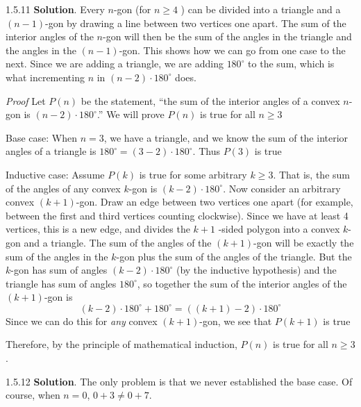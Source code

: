 \documentclass[11pt,]{book}
\makeatletter
\theoremstyle{ptxplainnotitle}
\theoremstyle{ptxplaintitle}
\renewcommand*{\proofname}{Proof}
\renewenvironment{proof}[1][\proofname]{\par
  \pushQED{\qed}%
  \normalfont \topsep6\p@\@plus6\p@\relax
  \trivlist
  \item\relax
    {\itshape
    #1\@addpunct{.}}\hspace\labelsep\ignorespaces
}{%
  \popQED\endtrivlist\@endpefalse
}
\theoremstyle{ptxdefinitionnotitle}
\theoremstyle{ptxdefinitiontitle}
\theoremstyle{ptxdefinitionnotitle}
\theoremstyle{ptxdefinitiontitle}
\theoremstyle{ptxdefinitionnotitle}
\theoremstyle{ptxdefinitiontitle}
\theoremstyle{ptxdefinitiontitlenonumber}
\theoremstyle{ptxdefinitiontitlenonumber}
\numberwithin{equation}{chapter}
\makeatother
\begin{document}
\begin{divisionexercise}{1.5.11}
\textbf{Solution}.\quad%
\hypertarget{p-608}{}%
Every \(n\)-gon (for \(n \ge 4\) ) can be divided into a triangle and a \((n-1)\)-gon by drawing a line between two vertices one apart.  The sum of the interior angles of the \(n\)-gon will then be the sum of the angles in the triangle and the angles in the \((n-1)\)-gon.  This shows how we can go from one case to the next.  Since we are adding a triangle, we are adding \(180^\circ\) to the sum, which is what incrementing \(n\) in \((n-2)\cdot 180^\circ\) does.%
\begin{proof}\hypertarget{proof-10}{}
\hypertarget{p-609}{}%
Let \(P(n)\) be the statement, ``the sum of the interior angles of a convex \(n\)-gon is \((n-2)\cdot 180^\circ\).''  We will prove \(P(n)\) is true for all \(n \ge 3\)%
\par
\hypertarget{p-610}{}%
Base case: When \(n=3\), we have a triangle, and we know the sum of the interior angles of a triangle is \(180^\circ = (3-2)\cdot 180^\circ\).  Thus \(P(3)\) is true%
\par
\hypertarget{p-611}{}%
Inductive case: Assume \(P(k)\) is true for some arbitrary \(k \ge 3\).  That is, the sum of the angles of any convex \(k\)-gon is \((k-2)\cdot 180^\circ\).  Now consider an arbitrary convex \((k+1)\)-gon.  Draw an edge between two vertices one apart (for example, between the first and third vertices counting clockwise).  Since we have at least 4 vertices, this is a new edge, and divides the \(k+1\) -sided polygon into a convex \(k\)-gon and a triangle.  The sum of the angles of the \((k+1)\)-gon will be exactly the sum of the angles in the \(k\)-gon plus the sum of the angles of the triangle.  But the \(k\)-gon has sum of angles \((k-2)\cdot 180^\circ\) (by the inductive hypothesis) and the triangle has sum of angles \(180^\circ\), so together the sum of the interior angles of the \((k+1)\)-gon is%
\begin{equation*}
(k-2)\cdot 180^\circ + 180^\circ = ((k+1)-2)\cdot 180^\circ
\end{equation*}
Since we can do this for \emph{any} convex \((k+1)\)-gon, we see that \(P(k+1)\) is true%
\par
\hypertarget{p-612}{}%
Therefore, by the principle of mathematical induction, \(P(n)\) is true for all \(n\ge 3\).%
\end{proof}
\end{divisionexercise}%
\begin{divisionexercise}{1.5.12}
\textbf{Solution}.\quad%
\hypertarget{p-615}{}%
The only problem is that we never established the base case. Of course, when \(n = 0\), \(0+3 \ne 0+7\).%
\end{divisionexercise}%
\end{document}
